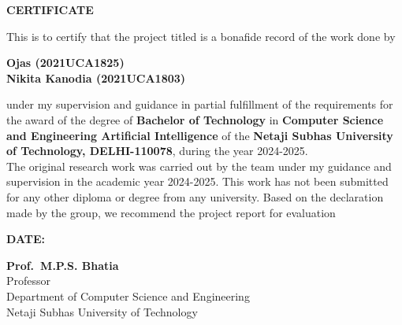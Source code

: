 \thispagestyle{plain}
\begin{center}
\large \large \textbf{CERTIFICATE}
\end{center}

\vspace{0.3cm}
\fontsize{12pt}{24pt}\selectfont This is to certify that the project titled \textbf{\btptitle} is a bonafide record of the work done by
\vspace{1.0cm}

\begin{center}
\textbf{Ojas (2021UCA1825)\\Nikita Kanodia (2021UCA1803)}
\end{center}

\vspace{1.0cm}
\noindent
\fontsize{12pt}{24pt}\selectfont under my supervision and guidance in partial fulfillment of the requirements for the award of the degree of \textbf{Bachelor of Technology} in \textbf{Computer Science and Engineering Artificial Intelligence} of the \textbf{Netaji Subhas University of Technology, DELHI-110078}, during the year 2024{-}2025.\\ \indent  The original research work was carried out by the team under my guidance and supervision in the academic year 2024{-}2025. This work has not been submitted for any other
 diploma or degree from any university. Based on the declaration made by the group, we
 recommend the project report for evaluation

\vspace{2.5cm}
\textbf{DATE\@: }
\begin{flushright}
\vspace{2.5cm}
 \textbf{Prof.~M.P.S. Bhatia} \\
 Professor\\
 Department of Computer Science and Engineering\\
 Netaji Subhas University of Technology

\end{flushright}






\newpage